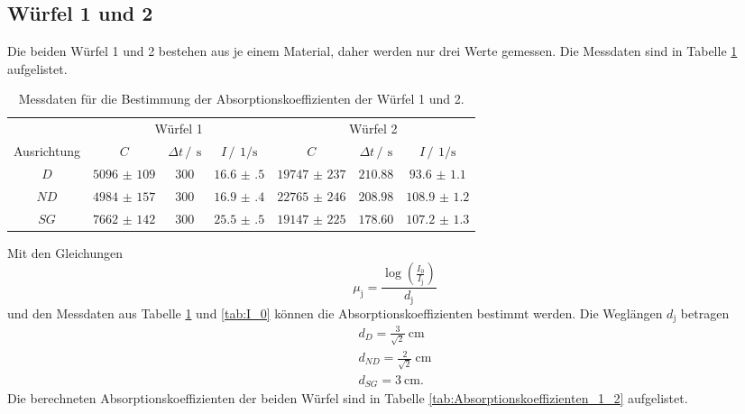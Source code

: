 \subsection{Würfel 1 und 2}
Die beiden Würfel 1 und 2 bestehen aus je einem Material, daher werden nur drei Werte gemessen.
Die Messdaten sind in Tabelle \ref{tab:Würfel_1_2} aufgelistet.
\FloatBarrier
\begin{table}
    \centering
    \caption{Messdaten für die Bestimmung der Absorptionskoeffizienten der Würfel 1 und 2.}
    \label{tab:Würfel_1_2}
    \begin{tabular}{c c c c c c c}
        \toprule
        &\multicolumn{3}{c}{Würfel 1}&\multicolumn{3}{c}{Würfel 2}\\
        \cmidrule(lr){2-4}\cmidrule(lr){5-7}
        Ausrichtung&$C$&$\Delta t \,/\,\SI{}{\second}$&$I \,/\,\SI{}{1\per\second}$&$C$&$\Delta t \,/\,\SI{}{\second}$&$I \,/\,\SI{}{1\per\second}$\\
        \midrule
        $D$ &$\num{5096(109)}$&$\num{300}$&$\num{16.6(5)}$&$\num{19747(237)}$&$\num{210.88}$&$\num{93.6(11)}$\\
        $ND$&$\num{4984(157)}$&$\num{300}$&$\num{16.9(4)}$&$\num{22765(246)}$&$\num{208.98}$&$\num{108.9(12)}$\\
        $SG$&$\num{7662(142)}$&$\num{300}$&$\num{25.5(5)}$&$\num{19147(225)}$&$\num{178.60}$&$\num{107.2(13)}$\\
        \bottomrule
    \end{tabular}
\end{table}
\FloatBarrier
Mit den Gleichungen
\begin{equation*}
    \mu_{\text{j}}= \frac{\log{\left(\frac{I_0}{I_\text{j}}\right)}}{d_{\text{j}}}
\end{equation*} 
und den Messdaten aus Tabelle \ref{tab:Würfel_1_2} und \ref{tab:I_0} können die Absorptionskoeffizienten bestimmt werden. 
Die Weglängen $d_{\text{j}}$ betragen
\begin{gather*}
    d_{D} =\frac{3}{\sqrt{2}}\SI{}{\centi\meter}\\
    d_{ND}=\frac{2}{\sqrt{2}}\SI{}{\centi\meter}\\
    d_{SG}=\SI{3}{\centi\meter}.
\end{gather*}
Die berechneten Absorptionskoeffizienten der beiden Würfel sind in Tabelle \ref{tab:Absorptionskoeffizienten_1_2} aufgelistet.
\FloatBarrier

